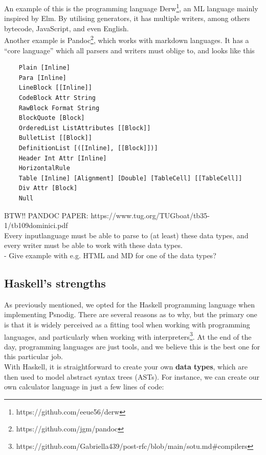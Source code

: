 An example of this is the programming language Derw\footnote{https://github.com/eeue56/derw}, an ML language mainly inspired by Elm. By utilising generators, it has multiple writers, among others bytecode, JavaScript, and even English. \hfill \\

Another example is Pandoc\footnote{https://github.com/jgm/pandoc}, which works with markdown languages. It has a ``core language'' which all parsers and writers must oblige to, and looks like this 

\begin{verbatim}
    Plain [Inline]
    Para [Inline]
    LineBlock [[Inline]]
    CodeBlock Attr String
    RawBlock Format String
    BlockQuote [Block]
    OrderedList ListAttributes [[Block]]
    BulletList [[Block]]
    DefinitionList [([Inline], [[Block]])]
    Header Int Attr [Inline]
    HorizontalRule
    Table [Inline] [Alignment] [Double] [TableCell] [[TableCell]]
    Div Attr [Block]
    Null
\end{verbatim}

BTW!! PANDOC PAPER: https://www.tug.org/TUGboat/tb35-1/tb109dominici.pdf \hfill \\

Every inputlanguage must be able to parse to (at least) these data types, and every writer must be able to work with these data types. \hfill \\

- Give example with e.g. HTML and MD for one of the data types?

\subsection{Haskell's strengths}
As previously mentioned, we opted for the Haskell programming language when implementing Psnodig. There are several reasons as to why, but the primary one is that it is widely perceived as a fitting tool when working with programming languages, and particularly when working with interpreters\footnote{https://github.com/Gabriella439/post-rfc/blob/main/sotu.md\#compilers}. At the end of the day, programming languages are just tools, and we believe this is the best one for this particular job. \hfill \\

With Haskell, it is straightforward to create your own \textbf{data types}, which are then used to model abstract syntax trees (ASTs). For instance, we can create our own calculator language in just a few lines of code:

